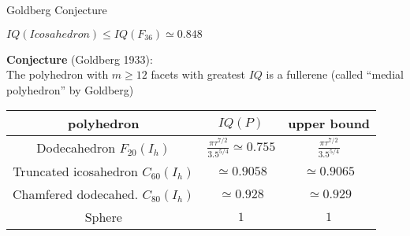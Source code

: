 \documentclass[%
pdf,
colorBG,
slideColor,
]{prosper}
\begin{document}



\begin{slide}{Goldberg Conjecture}
\vspace{-7mm}
\begin{center}
\begin{center}
\end{center}
$IQ(Icosahedron)  \leq IQ(F_{36})\simeq 0.848$
\end{center}

{\bf Conjecture} (Goldberg 1933):\\
The polyhedron with $m\geq 12$ facets with greatest $IQ$ is a fullerene (called ``medial polyhedron'' by Goldberg)

\begin{center}
\begin{tabular}{|c|c|c|}
\hline
polyhedron & $IQ(P)$  & upper bound\\
\hline\hline
Dodecahedron $F_{20}(I_h)$& $\frac{\pi \tau^{7/2}}{3.5^{5/4}}\simeq 0.755$ & $\frac{\pi \tau^{7/2}}{3.5^{5/4}}$\\\hline
Truncated icosahedron $C_{60}(I_h)$&$\simeq 0.9058$ & $\simeq 0.9065$\\\hline
Chamfered dodecahed. $C_{80}(I_h)$&$\simeq 0.928$ & $\simeq 0.929$\\\hline
Sphere &$1$ & $1$\\\hline\hline
\end{tabular}
\end{center}

\end{slide}
\end{document}
